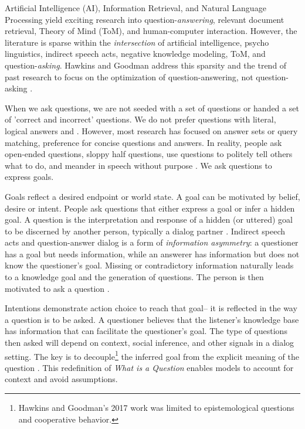 Artificial Intelligence (AI), Information Retrieval, and Natural Language Processing yield exciting research into question-\emph{answering}, relevant document retrieval, Theory of Mind (ToM), and human-computer interaction. However, the literature is sparse within the  \emph{intersection} of artificial intelligence, psycho linguistics, indirect speech acts, negative knowledge modeling, ToM, and question-\emph{asking}. Hawkins and Goodman address this sparsity and the trend of past research to focus on the optimization of question-answering, not question-asking \citep{hawkins_goodman_2017}. 


When we ask questions, we are not seeded with a set of questions or handed a set of 'correct and incorrect' questions. We do not prefer questions with literal, logical answers \citep{rothe_lake_gureckis_2017} and \citep{clark_1979}. However, most research has focused on answer sets or query matching, preference for concise questions and answers. In reality, people ask open-ended questions, sloppy half questions, use questions to politely tell others what to do, and meander in speech without purpose \citep{brown_1980}. We ask questions to express goals. 

Goals reflect a desired endpoint or world state. A goal can be motivated by belief, desire or intent. People ask questions that either express a goal or infer a hidden goal. A question is the interpretation and response of a hidden (or uttered) goal to be discerned
by another person, typically a dialog partner \citep{hawkins_goodman_2017}. Indirect speech acts and question-answer dialog is a form of \emph{information asymmetry}: a questioner has a goal but needs information, while an answerer has information but does not know the questioner’s goal. Missing or contradictory information naturally leads to a knowledge goal and the generation of questions. The person is then motivated to ask a question \citep{alaimi_2020}. 

Intentions demonstrate action choice to reach that goal-- it is reflected in the way a question is to be asked. A questioner believes that the listener’s knowledge base has information that can facilitate the questioner’s goal.  The type of questions then asked will depend on context, social inference, and other signals in a dialog setting. The key is to decouple\footnote{Hawkins and Goodman's 2017 work was limited to epistemological questions and cooperative behavior.} the inferred goal from the explicit meaning of the question \citep{hawkins_goodman_2017}. This redefinition of \emph{What is a Question} enables models to account for context and avoid assumptions. 

